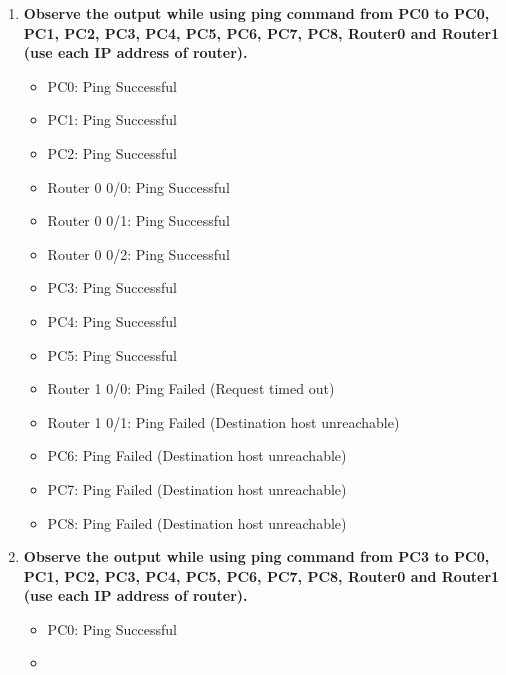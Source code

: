 \documentclass[a4paper,11pt]{article}
\begin{document}
\begin{enumerate}
      \item \textbf{Observe the output while using ping command from PC0 to PC0, PC1, PC2, PC3, PC4, PC5, PC6, PC7, PC8, Router0 and Router1 (use each IP address of router).}
            \begin{itemize}
                  \item PC0: Ping Successful
                  \item PC1: Ping Successful
                  \item PC2: Ping Successful
                  \item Router 0 0/0: Ping Successful
                  \item Router 0 0/1: Ping Successful
                  \item Router 0 0/2: Ping Successful
                  \item PC3: Ping Successful
                  \item PC4: Ping Successful
                  \item PC5: Ping Successful
                  \item Router 1 0/0: Ping Failed (Request timed out)
                  \item Router 1 0/1: Ping Failed (Destination host unreachable)
                  \item PC6: Ping Failed (Destination host unreachable)
                  \item PC7: Ping Failed (Destination host unreachable)
                  \item PC8: Ping Failed (Destination host unreachable)
            \end{itemize}



      \item \textbf{Observe the output while using ping command from PC3 to PC0, PC1, PC2, PC3, PC4, PC5, PC6, PC7, PC8, Router0 and Router1 (use each IP address of router).}
            \begin{itemize}
                  \item PC0: Ping Successful
                  \item {}


\end{itemize}
\end{enumerate}
\end{document}
